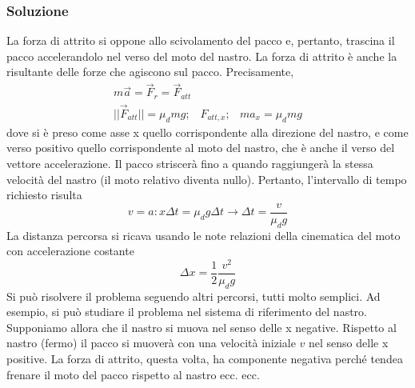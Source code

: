 \subsubsection{Soluzione}
La forza di attrito si oppone allo scivolamento del pacco e, pertanto, trascina il pacco accelerandolo nel verso del moto del nastro. La forza di attrito è anche la risultante delle forze che agiscono sul pacco. Precisamente,
\begin{eqnarray*}
	m\overrightarrow{a}=\overrightarrow{F}_r=\overrightarrow{F}_{att}\\
	||\overrightarrow{F}_{att}||=\mu_dmg;&F_{att,x};&ma_x=\mu_dmg
\end{eqnarray*}
dove si è  preso come asse x quello corrispondente alla direzione del nastro, e come verso positivo quello corrispondente al moto del nastro, che è anche il verso del vettore accelerazione. Il pacco striscerà fino a quando raggiungerà la stessa velocità del nastro (il moto relativo diventa nullo). Pertanto, l’intervallo di tempo richiesto risulta
\begin{equation*}
	v=a:x\Delta t=\mu_dg\Delta t\to \Delta t=\frac{v}{\mu_dg}
\end{equation*}
La distanza percorsa si ricava usando le note relazioni della cinematica del moto con accelerazione costante
\begin{equation*}
	\Delta x=\frac{1}{2}\frac{v^2}{\mu_dg}
\end{equation*}
Si può risolvere il problema seguendo altri percorsi, tutti molto semplici. Ad esempio, si può studiare il problema nel sistema di riferimento del nastro. Supponiamo allora che il nastro si muova nel senso delle x negative. Rispetto al nastro (fermo) il pacco si muoverà con una velocità iniziale $v$ nel senso delle x positive. La forza di attrito, questa volta, ha componente negativa perché tendea frenare il moto del pacco rispetto al nastro ecc. ecc.
